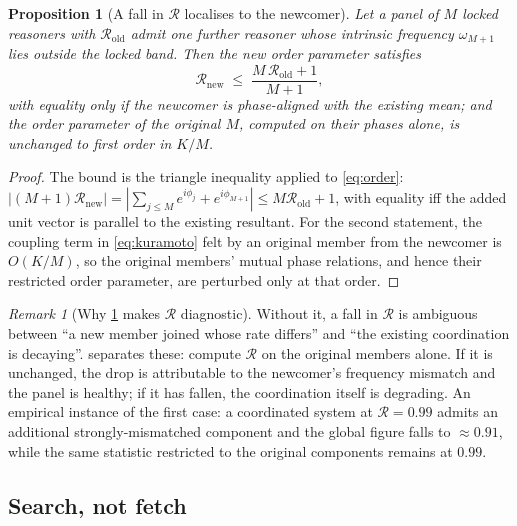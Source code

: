 \documentclass[11pt,twocolumn,a4paper]{article}
\theoremstyle{plain}
\newtheorem{proposition}[theorem]{Proposition}
\theoremstyle{definition}
\theoremstyle{remark}
\newtheorem{remark}[theorem]{Remark}
\begin{document}
\begin{proposition}[A fall in $\mathcal{R}$ localises to the newcomer]
\label{prop:localisation}
Let a panel of $M$ locked reasoners with $\mathcal{R}_{\mathrm{old}}$ admit one
further reasoner whose intrinsic frequency $\omega_{M+1}$ lies outside the locked
band. Then the new order parameter satisfies
\begin{equation}
\mathcal{R}_{\mathrm{new}} \;\le\; \frac{M\,\mathcal{R}_{\mathrm{old}} + 1}{M+1},
\label{eq:localise}
\end{equation}
with equality only if the newcomer is phase-aligned with the existing mean;
and the order parameter of the original $M$, computed on their phases alone,
is unchanged to first order in $K/M$.
\end{proposition}

\begin{proof}
The bound is the triangle inequality applied to \cref{eq:order}:
$|(M+1)\mathcal{R}_{\mathrm{new}}| = |\sum_{j\le M}e^{i\phi_j} + e^{i\phi_{M+1}}|
\le M\mathcal{R}_{\mathrm{old}} + 1$, with equality iff the added unit vector is
parallel to the existing resultant. For the second statement, the coupling term
in \cref{eq:kuramoto} felt by an original member from the newcomer is
$O(K/M)$, so the original members' mutual phase relations, and hence their
restricted order parameter, are perturbed only at that order.
\end{proof}

\begin{remark}[Why \cref{prop:localisation} makes $\mathcal{R}$ diagnostic]
\label{rem:localisation-use}
Without it, a fall in $\mathcal{R}$ is ambiguous between ``a new member joined
whose rate differs'' and ``the existing coordination is decaying''.
 separates these: compute $\mathcal{R}$ on the original
members alone. If it is unchanged, the drop is attributable to the newcomer's
frequency mismatch and the panel is healthy; if it has fallen, the coordination
itself is degrading. An empirical instance of the first case: a coordinated
system at $\mathcal{R} = 0.99$ admits an additional strongly-mismatched
component and the global figure falls to $\approx 0.91$, while the same
statistic restricted to the original components remains at $0.99$.
\end{remark}

\subsection{Search, not fetch}
\end{document}
